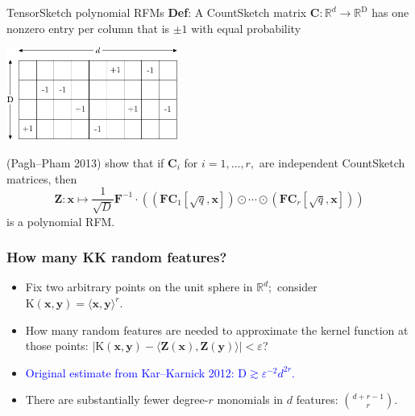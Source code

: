 \documentclass[xcolor=x11names,compress,ignorenonframetext,10pt]{beamer}
\renewcommand{\(}{\begin{columns}}
\renewcommand{\)}{\end{columns}}
\newcommand{\<}[1]{\begin{column}{#1}}
\renewcommand{\>}{\end{column}}
\def\refcolor{DodgerBlue4}
\newcommand{\refer}[1]{({\color{\refcolor}#1})}
\begin{document}
\begin{frame}{TensorSketch polynomial RFMs}
    \textbf{Def}: A CountSketch matrix $\mathbf{C} : \mathbb{R}^d \rightarrow \mathbb{R}^{\textrm{D}}$ has one nonzero entry per column
    that is $\pm 1$ with equal probability \\
\begin{center}
  \includegraphics[height=1.2in]{figures/craftmaps/alex_illust/countsketch}
\end{center}
\vspace{-.25cm}

\refer{Pagh--Pham 2013} show that if $\mathbf{C}_i$ for $i=1, \ldots, r,$ are independent CountSketch matrices, then 
\[
  \textbf{Z} : \mathbf{x} \mapsto \frac{1}{\sqrt{D}} \mathbf{F}^{-1} \cdot
    \left( (\mathbf{F} \mathbf{C}_1 [\sqrt{q}, \mathbf{x}]) \odot \cdots \odot 
    (\mathbf{F} \mathbf{C}_r [\sqrt{q}, \mathbf{x}]) \right)
\]
is a polynomial RFM.
\end{frame}

\begin{frame}
\frametitle{How many KK random features?}
\begin{itemize}
  \item Fix two arbitrary points on the unit sphere in $\mathbb{R}^d;$ consider $\mathrm{K}(\mathbf{x}, \mathbf{y}) = \langle \mathbf{x}, \mathbf{y} \rangle^r.$
\item How many random features are needed to approximate the kernel function at those points: $|\mathrm{K}(\mathbf{x},\mathbf{y}) - \langle \mathbf{Z}(\mathbf{x}), \mathbf{Z}(\mathbf{y})\rangle| < \varepsilon$?
\item \textcolor{blue}{Original estimate from Kar--Karnick 2012: $\mathrm{D} \gtrsim \varepsilon^{-2} d^{2r}.$}
\item There are substantially fewer degree-$r$ monomials in $d$ features: $\binom{d+r-1}{r}.$

\end{itemize}
\end{frame}
\end{document}
